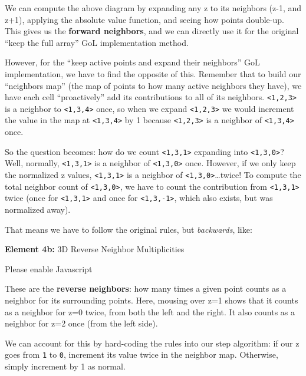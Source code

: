 \documentclass[]{article}
\begin{document}
We can compute the above diagram by expanding any z to its neighbors (z-1, and
z+1), applying the absolute value function, and seeing how points double-up.
This gives us the \textbf{forward neighbors}, and we can directly use it for the
original ``keep the full array'' GoL implementation method.

However, for the ``keep active points and expand their neighbors'' GoL
implementation, we have to find the opposite of this. Remember that to build our
``neighbors map'' (the map of points to how many active neighbors they have), we
have each cell ``proactively'' add its contributions to all of its neighbors.
\texttt{\textless{}1,2,3\textgreater{}} is a neighbor to
\texttt{\textless{}1,3,4\textgreater{}} once, so when we expand
\texttt{\textless{}1,2,3\textgreater{}} we would increment the value in the map
at \texttt{\textless{}1,3,4\textgreater{}} by 1 because
\texttt{\textless{}1,2,3\textgreater{}} is a neighbor of
\texttt{\textless{}1,3,4\textgreater{}} once.

So the question becomes: how do we count \texttt{\textless{}1,3,1\textgreater{}}
expanding into \texttt{\textless{}1,3,0\textgreater{}}? Well, normally,
\texttt{\textless{}1,3,1\textgreater{}} is a neighbor of
\texttt{\textless{}1,3,0\textgreater{}} once. However, if we only keep the
normalized z values, \texttt{\textless{}1,3,1\textgreater{}} is a neighbor of
\texttt{\textless{}1,3,0\textgreater{}}\ldots twice! To compute the total
neighbor count of \texttt{\textless{}1,3,0\textgreater{}}, we have to count the
contribution from \texttt{\textless{}1,3,1\textgreater{}} twice (once for
\texttt{\textless{}1,3,1\textgreater{}} and once for
\texttt{\textless{}1,3,-1\textgreater{}}, which also exists, but was normalized
away).

That means we have to follow the original rules, but \emph{backwards}, like:

\leavevmode\hypertarget{golSyms3DReverse}{}%
\textbf{Element 4b:} 3D Reverse Neighbor Multiplicities

\leavevmode\hypertarget{golSyms3DReverseCont}{}%
Please enable Javascript

These are the \textbf{reverse neighbors}: how many times a given point counts as
a neighbor for its surrounding points. Here, mousing over z=1 shows that it
counts as a neighbor for z=0 twice, from both the left and the right. It also
counts as a neighbor for z=2 once (from the left side).

We can account for this by hard-coding the rules into our step algorithm: if our
z goes from \texttt{1} to \texttt{0}, increment its value twice in the neighbor
map. Otherwise, simply increment by 1 as normal.
\end{document}

